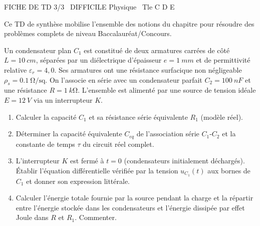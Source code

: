 \documentclass[11pt]{article}
\begin{document}
\begin{tcolorbox}[enhanced,colback=popink,colframe=popink,arc=10pt,boxrule=0pt,left=12pt,right=12pt,top=9pt,bottom=9pt]
{\color{white}\popxbold\small FICHE DE TD 3/3 \textbullet\ DIFFICILE \hfill Physique \textbullet\ Tle C D E\par}
\end{tcolorbox}
\vspace{4pt}
Ce TD de synthèse mobilise l'ensemble des notions du chapitre pour résoudre des problèmes complets de niveau Baccalauréat/Concours.

\begin{exercice}
Un condensateur plan $C_1$ est constitué de deux armatures carrées de côté $L = \SI{10}{cm}$, séparées par un diélectrique d'épaisseur $e = \SI{1}{mm}$ et de permittivité relative $\varepsilon_r = 4,0$. Ses armatures ont une résistance surfacique non négligeable $\rho_s = \SI{0,1}{\ohm\per\text{sq}}$. On l'associe en série avec un condensateur parfait $C_2 = \SI{100}{nF}$ et une résistance $R = \SI{1}{k\ohm}$. L'ensemble est alimenté par une source de tension idéale $E = \SI{12}{V}$ via un interrupteur $K$.
\begin{enumerate}
    \item Calculer la capacité $C_1$ et sa résistance série équivalente $R_1$ (modèle réel).
    \item Déterminer la capacité équivalente $C_{eq}$ de l'association série $C_1$-$C_2$ et la constante de temps $\tau$ du circuit réel complet.
    \item L'interrupteur $K$ est fermé à $t=0$ (condensateurs initialement déchargés). Établir l'équation différentielle vérifiée par la tension $u_{C_1}(t)$ aux bornes de $C_1$ et donner son expression littérale.
    \item Calculer l'énergie totale fournie par la source pendant la charge et la répartir entre l'énergie stockée dans les condensateurs et l'énergie dissipée par effet Joule dans $R$ et $R_1$. Commenter.
\end{enumerate}
\end{exercice}
\end{document}
